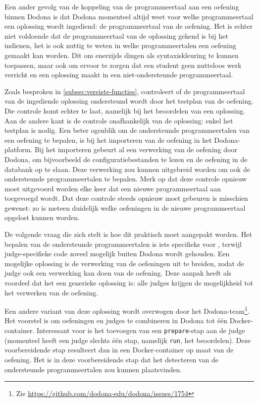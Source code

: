 Een ander gevolg van de koppeling van de programmeertaal aan een oefening binnen Dodona is dat Dodona momenteel altijd weet voor welke programmeertaal een oplossing wordt ingediend: de programmeertaal van de oefening.
Het is echter niet voldoende dat de programmeertaal van de oplossing gekend is bij het indienen,
het is ook nuttig te weten in welke programmeertalen een oefening gemaakt kan worden.
Dit om enerzijds dingen als syntaxiskleuring te kunnen toepassen, maar ook om ervoor te zorgen dat een student geen nutteloos werk verricht en een oplossing maakt in een niet-ondersteunde programmeertaal.

Zoals besproken in \cref{subsec:vereiste-functies}, controleert \tested{} of de programmeertaal van de ingediende oplossing ondersteund wordt door het testplan van de oefening.
Die controle komt echter te laat, namelijk bij het beoordelen van een oplossing.
Aan de andere kant is de controle onafhankelijk van de oplossing: enkel het testplan is nodig.
Een beter ogenblik om de ondersteunde programmeertalen van een oefening te bepalen, is bij het importeren van de oefening in het Dodona-platform.
Bij het importeren gebeurt al een verwerking van de oefening door Dodona, om bijvoorbeeld de configuratiebestanden te lezen en de oefening in de databank op te slaan.
Deze verwerking zou kunnen uitgebreid worden om ook de ondersteunde programmeertalen te bepalen.
Merk op dat deze controle opnieuw moet uitgevoerd worden elke keer dat een nieuwe programmeertaal aan \tested{} toegevoegd wordt.
Dat deze controle steeds opnieuw moet gebeuren is misschien gewenst: zo is meteen duidelijk welke oefeningen in de nieuwe programmeertaal opgelost kunnen worden.

De volgende vraag die zich stelt is hoe dit praktisch moet aangepakt worden.
Het bepalen van de ondersteunde programmeertalen is iets specifieks voor \tested{}, terwijl judge-specifieke code zoveel mogelijk buiten Dodona wordt gehouden.
Een mogelijke oplossing is de verwerking van de oefeningen uit te breiden, zodat de judge ook een verwerking kan doen van de oefening.
Deze aanpak heeft als voordeel dat het een generieke oplossing is: alle judges krijgen de mogelijkheid tot het verwerken van de oefening.

Een andere variant van deze oplossing wordt overwogen door het Dodona-team\footnote{Zie \url{https://github.com/dodona-edu/dodona/issues/1754}}.
Het voorstel is om oefeningen en judges te combineren in Dodona tot één Docker-container.
Interessant voor \tested{} is het toevoegen van een \texttt{prepare}-stap aan de judge (momenteel heeft een judge slechts één stap, namelijk \texttt{run}, het beoordelen).
Deze voorbereidende stap resulteert dan in een Docker-container op maat van de oefening.
Het is in deze voorbereidende stap dat het detecteren van de ondersteunde programmeertalen zou kunnen plaatsvinden.

